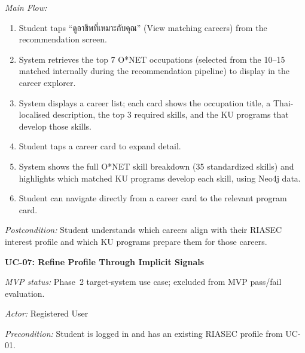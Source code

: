 \noindent\textit{Main Flow:}
\begin{enumerate}[leftmargin=80pt]
    \item Student taps ``ดูอาชีพที่เหมาะกับคุณ'' (View matching careers) from the recommendation screen.
    \item System retrieves the top 7 O*NET occupations (selected from the 10--15 matched internally during the recommendation pipeline) to display in the career explorer.
    \item System displays a career list; each card shows the occupation title, a Thai-localised description, the top 3 required skills, and the KU programs that develop those skills.
    \item Student taps a career card to expand detail.
    \item System shows the full O*NET skill breakdown (35 standardized skills) and highlights which matched KU programs develop each skill, using Neo4j data.
    \item Student can navigate directly from a career card to the relevant program card.
\end{enumerate}

\noindent\textit{Postcondition:} Student understands which careers align with their RIASEC interest profile and which KU programs prepare them for those careers.

\vspace{1ex}
\noindent\textbf{UC-07: Refine Profile Through Implicit Signals}

\noindent\textit{MVP status:} Phase~2 target-system use case; excluded from MVP pass/fail evaluation.

\noindent\textit{Actor:} Registered User

\noindent\textit{Precondition:} Student is logged in and has an existing RIASEC profile from UC-01.

